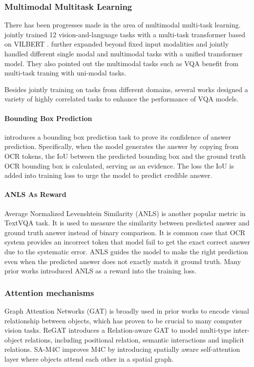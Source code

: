 \documentclass[11pt,a4paper]{article}
\begin{document}
\subsubsection{Multimodal Multitask Learning}
There has been progresses made in the area of multimodal multi-task learning. \citet{lu202012} jointly trained 12 vision-and-language tasks with a multi-task transformer based on VILBERT \cite{lu2019vilbert}. \citet{hu2021unit} further expanded beyond fixed input modalities and jointly handled different single modal and multimodal tasks with a unified transformer model. They also pointed out the multimodal tasks such as VQA benefit from multi-task traning with uni-modal tasks.

Besides jointly training on tasks from different domains, several works designed a variety of highly correlated tasks to enhance the performance of VQA models.

\paragraph{Bounding Box Prediction}\citet{han2020finding} introduces a bounding box prediction task to prove its confidence of answer prediction. Specifically, when the model generates the answer by copying from OCR tokens, the IoU between the predicted bounding box and the ground truth OCR bounding box is calculated, serving as an evidence. The loss the IoU is added into training loss to urge the model to predict credible answer.

\paragraph{ANLS As Reward}Average Normalized Levenshtein Similarity (ANLS) is another popular metric in TextVQA task. It is used to measure the similarity between predicted answer and ground truth answer instead of binary comparison. It is common case that OCR system provides an incorrect token that model fail to get the exact correct answer due to the systematic error. ANLS guides the model to make the right prediction even when the predicted answer does not exactly match it ground truth. Many prior works\cite{zhu2020simple, liu2020cascade} introduced ANLS as a reward into the training loss.

\subsubsection{Attention mechanisms}
Graph Attention Networks (GAT)\cite{velivckovic2017graph} is broadly used in prior works to encode visual relationship between objects, which has proven to be crucial to many computer vision tasks. ReGAT\cite{li2019regat} introduces a Relation-aware GAT to model multi-type inter-object relations, including positional relation, semantic interactions and implicit relations. SA-M4C\cite{kant2020spatially} improves M4C by introducing spatially aware self-attention layer where objects attend each other in a spatial graph.
\end{document}
